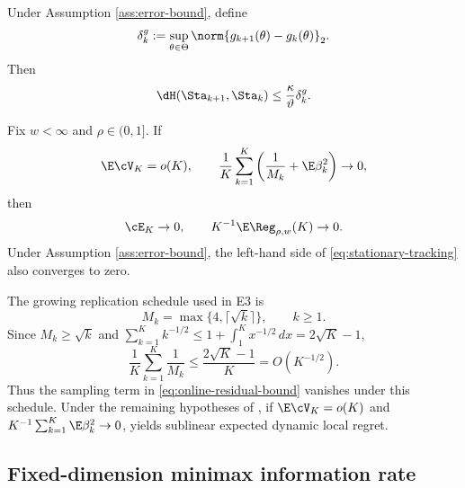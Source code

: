 \begin{lemma}\label{lem:stationary-set-drift}
Under Assumption \ref{ass:error-bound}, define
\begin{equation}\label{eq:gradient-drift}
 \delta_k^g:=\sup_{\theta\in\Theta}
 \norm{g_{k+1}(\theta)-g_k(\theta)}_2.
\end{equation}
Then
\begin{equation}\label{eq:stationary-set-drift}
 \dH(\Sta_{k+1},\Sta_k)
 \le\frac{\kappa}{\vartheta}\delta_k^g.
\end{equation}
\end{lemma}

\begin{corollary}\label{cor:vanishing-tracking}
Fix $w<\infty$ and $\rho\in(0,1]$.  If
\begin{equation}\label{eq:vanishing-conditions}
 \E\cV_K=o(K),
 \qquad
 \frac1K\sum_{k=1}^{K}
 \left(\frac1{M_k}+\E\beta_k^2\right)\to0,
\end{equation}
then
\begin{equation}\label{eq:vanishing-conclusion}
 \cE_K\to0,
 \qquad
 K^{-1}\E\Reg_{\rho,w}(K)\to0.
\end{equation}
Under Assumption \ref{ass:error-bound}, the left-hand side of \eqref{eq:stationary-tracking} also converges to zero.
\end{corollary}

The growing replication schedule used in E3 is
\begin{equation}\label{eq:growing-replication}
 M_k=\max\{4,\lceil\sqrt{k}\rceil\},\qquad k\ge1.
\end{equation}
Since $M_k\ge\sqrt{k}$ and
$\sum_{k=1}^{K}k^{-1/2}\le1+\int_1^K x^{-1/2}\,dx=2\sqrt K-1$,
\begin{equation}\label{eq:growing-replication-bound}
 \frac1K\sum_{k=1}^{K}\frac1{M_k}
 \le\frac{2\sqrt K-1}{K}=O(K^{-1/2}).
\end{equation}
Thus the sampling term in \eqref{eq:online-residual-bound} vanishes under this schedule.  Under the remaining hypotheses of , if $\E\cV_K=o(K)$ and $K^{-1}\sum_{k=1}^{K}\E\beta_k^2\to0$,  yields sublinear expected dynamic local regret.

\subsection{Fixed-dimension minimax information rate}

